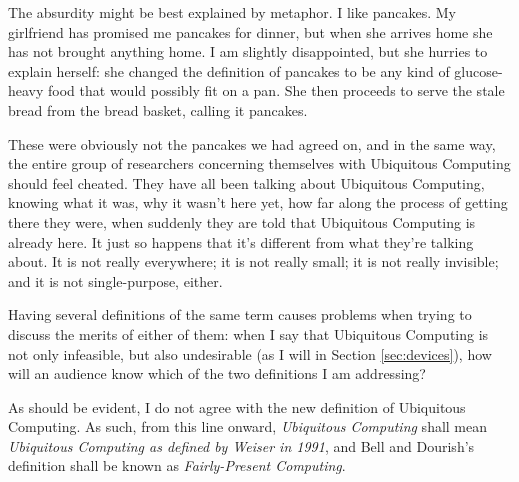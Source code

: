 The absurdity might be best explained by metaphor. I like pancakes. My girlfriend has promised me pancakes for dinner,
but when she arrives home she has not brought anything home. I am slightly disappointed, but she hurries to explain
herself: she changed the definition of pancakes to be any kind of glucose-heavy food that would possibly fit on a pan.
She then proceeds to serve the stale bread from the bread basket, calling it pancakes.

These were obviously not the pancakes we had agreed on, and in the same way, the entire group of researchers concerning
themselves with Ubiquitous Computing should feel cheated. They have all been talking about Ubiquitous Computing, knowing
what it was, why it wasn't here yet, how far along the process of getting there they were, when suddenly they are told
that Ubiquitous Computing is already here. It just so happens that it's different from what they're talking about. It is
not really everywhere; it is not really small; it is not really invisible; and it is not single-purpose, either.

Having several definitions of the same term causes problems when trying to discuss the merits of either of them: when I say
that Ubiquitous Computing is not only infeasible, but also undesirable (as I will in Section \ref{sec:devices}), how will
an audience know which of the two definitions I am addressing?

As should be evident, I do not agree with the new definition of Ubiquitous Computing. As such, from this line onward,
\emph{Ubiquitous Computing} shall mean \emph{Ubiquitous Computing as defined by Weiser in 1991}, and Bell and Dourish's
definition shall be known as \emph{Fairly-Present Computing}.